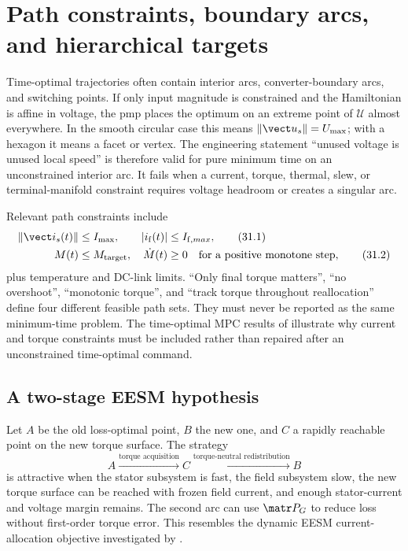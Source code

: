 \section{Path constraints, boundary arcs, and hierarchical targets}
\label{sec:dynamic-constraints}

Time-optimal trajectories often contain interior arcs, converter-boundary
arcs, and switching points.  If only input magnitude is constrained and the
Hamiltonian is affine in voltage, the \gls{pmp} places the optimum on an
extreme point of \(\mathcal U\) almost everywhere.  In the smooth circular
case this means \(\|\vect u_s\|=U_{\max}\); with a hexagon it means a facet or
vertex.  The engineering statement ``unused voltage is unused local speed''
is therefore valid for pure minimum time on an unconstrained interior arc.  It
fails when a current, torque, thermal, slew, or terminal-manifold constraint
requires voltage headroom or creates a singular arc.

Relevant path constraints include
\begin{align}
 \|\vect i_s(t)\|&\leq I_{\max}, & |i_{\mathrm f}(t)|&\leq I_{\mathrm f,max},
 \tag{31.1}\\
 M(t)&\leq M_{\mathrm{target}}, & \dot M(t)&\geq0
 \quad\text{for a positive monotone step},
 \tag{31.2}
\end{align}
plus temperature and DC-link limits.  ``Only final torque matters'', ``no
overshoot'', ``monotonic torque'', and ``track torque throughout
reallocation'' define four different feasible path sets.  They must never be
reported as the same minimum-time problem.  The time-optimal MPC results of
\textcite{brosch2023} illustrate why current and torque constraints must be
included rather than repaired after an unconstrained time-optimal command.

\subsection{A two-stage EESM hypothesis}

Let \(A\) be the old loss-optimal point, \(B\) the new one, and \(C\) a rapidly
reachable point on the new torque surface.  The strategy
\[
 A\xrightarrow{\text{torque acquisition}}C
 \xrightarrow{\text{torque-neutral redistribution}}B
 \tag{31.3}
\]
is attractive when the stator subsystem is fast, the field subsystem slow,
the new torque surface can be reached with frozen field current, and enough
stator-current and voltage margin remains.  The second arc can use
\(\matr P_G\) to reduce loss without first-order torque error.  This resembles
the dynamic EESM current-allocation objective investigated by
\textcite{reinhard2024dynamic}.

